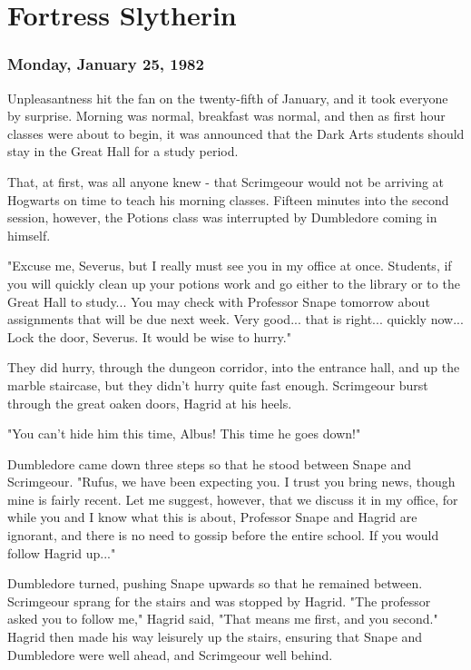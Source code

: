 
\chapter{Fortress Slytherin}

\subsection{Monday, January 25, 1982}

Unpleasantness hit the fan on the twenty-fifth of January, and it took everyone by surprise. Morning was normal, breakfast was normal, and then as first hour classes were about to begin, it was announced that the Dark Arts students should stay in the Great Hall for a study period.

That, at first, was all anyone knew - that Scrimgeour would not be arriving at Hogwarts on time to teach his morning classes. Fifteen minutes into the second session, however, the Potions class was interrupted by Dumbledore coming in himself.

"Excuse me, Severus, but I really must see you in my office at once. Students, if you will quickly clean up your potions work and go either to the library or to the Great Hall to study... You may check with Professor Snape tomorrow about assignments that will be due next week. Very good... that is right... quickly now... Lock the door, Severus. It would be wise to hurry."

They did hurry, through the dungeon corridor, into the entrance hall, and up the marble staircase, but they didn't hurry quite fast enough. Scrimgeour burst through the great oaken doors, Hagrid at his heels.

"You can't hide him this time, Albus! This time he goes down!"

Dumbledore came down three steps so that he stood between Snape and Scrimgeour. "Rufus, we have been expecting you. I trust you bring news, though mine is fairly recent. Let me suggest, however, that we discuss it in my office, for while you and I know what this is about, Professor Snape and Hagrid are ignorant, and there is no need to gossip before the entire school. If you would follow Hagrid up..."

Dumbledore turned, pushing Snape upwards so that he remained between. Scrimgeour sprang for the stairs and was stopped by Hagrid. "The professor asked you to follow me," Hagrid said, "That means me first, and you second." Hagrid then made his way leisurely up the stairs, ensuring that Snape and Dumbledore were well ahead, and Scrimgeour well behind.

